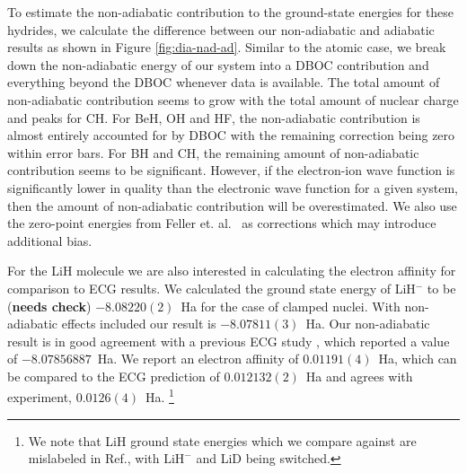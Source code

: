\documentclass[pra,superscriptaddress,groupedaddress,twocolumn]{revtex4}
\begin{document}
To estimate the non-adiabatic contribution to the ground-state energies for these hydrides, we calculate the difference between our non-adiabatic and adiabatic results as shown in Figure \ref{fig:dia-nad-ad}. Similar to the atomic case, we break down the non-adiabatic energy of our system into a DBOC contribution and everything beyond the DBOC whenever data is available. The total amount of non-adiabatic contribution seems to grow with the total amount of nuclear charge and peaks for CH. For BeH, OH and HF, the non-adiabatic contribution is almost entirely accounted for by DBOC with the remaining correction being zero within error bars. For BH and CH, the remaining amount of non-adiabatic contribution seems to be significant. %
However, if the electron-ion wave function is significantly lower in quality than the electronic wave function for a given system, then the amount of non-adiabatic contribution will be overestimated. We also use the zero-point energies from Feller et. al.~\cite{Feller_Corrections} as corrections which may introduce additional bias.

For the LiH molecule we are also interested in calculating the electron affinity for comparison to ECG results. We calculated the ground state energy of LiH$^-$ to be (\textbf{needs check}) $-8.08220(2)$~Ha for the case of clamped nuclei. With non-adiabatic effects included our result is  $-8.07811(3)$~Ha. Our non-adiabatic result is in good agreement with a previous ECG study \cite{Bubin_LiH_noBO}, which reported a value of $-8.07856887$~Ha. We report an electron affinity of $0.01191(4)$~Ha, which can be compared to the ECG prediction of $0.012132(2)$~Ha and agrees with experiment, $0.0126(4)$~Ha. \footnote{We note that LiH ground state energies which we compare against are mislabeled in Ref.\cite{Bubin_LiH_noBO}, with $\text{LiH}^-$ and LiD being switched.}
\end{document}
